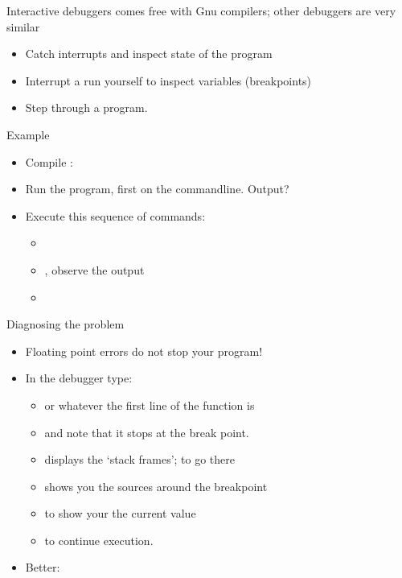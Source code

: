 \documentclass[11pt,headernav]{beamer}
\begin{document}
\begin{frame}[containsverbatim]{Interactive debuggers}
   comes free with Gnu compilers; other debuggers are very
  similar
  \begin{itemize}
  \item Catch interrupts and inspect state of the program
  \item Interrupt a run yourself to inspect variables (breakpoints)
  \item Step through a program.
  \end{itemize}
\end{frame}

\begin{frame}[containsverbatim]{Example}
  \begin{itemize}
  \item
    Compile : 
  \item 
    Run the program, first on the commandline. Output?
  \item Execute this sequence of commands:
    \begin{itemize}
    \item {}
    \item {}, observe the output
    \item {}
    \end{itemize}
  \end{itemize}
\end{frame}

\begin{frame}[containsverbatim]{Diagnosing the problem}
  \begin{itemize}
  \item Floating point errors do not stop your program!
  \item In the debugger type:
    \begin{itemize}
    \item {} or whatever the first line of the
       function is
    \item {} and note that it stops at the break point.
    \item {} displays the `stack frames';  to go there
    \item {} shows you the sources around the breakpoint
    \item {} to show your the current value
    \item {} to continue execution.
    \end{itemize}
  \item Better: 
  \end{itemize}
\end{frame}
\end{document}
